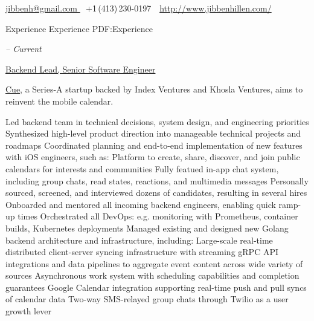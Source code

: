 \documentclass[letterpaper,nonstopmode]{simpleresumecv}
\newcommand{\CVAuthor}{Jibben Hillen}
\newcommand{\CVWebpage}{http://www.jibbenhillen.com/}
\begin{document}

\Title{\CVAuthor}

\begin{SubTitle}
\href{mailto:jibbenh@gmail.com}
{jibbenh@gmail.com }
\,\SubBulletSymbol\,
+1\,(413)\,230-0197
\,\SubBulletSymbol\,
\href{\CVWebpage}
{\url{\CVWebpage}}
\end{SubTitle}

\begin{Body}
\thispagestyle{empty}


\Section
{Experience}
{Experience}
{PDF:Experience}

\Entry
{}
\hfill \textit{ -- Current}
\SmallGap
\begin{Position}\underline{Backend Lead, Senior Software Engineer}\end{Position}
\Gap
\begin{Detail} \href{https://www.cue.app}{Cue}, a Series-A startup backed by Index Ventures and Khosla Ventures, aims to reinvent the mobile calendar.
\end{Detail}
\SmallGap
\BulletItem Led backend team in technical decisions, system design, and engineering priorities
\BulletItem Synthesized high-level product direction into manageable technical projects and roadmaps
\BulletItem Coordinated planning and end-to-end implementation of new features with iOS engineers, such as:
\SubBulletItem Platform to create, share, discover, and join public calendars for interests and communities
\SubBulletItem Fully featued in-app chat system, including group chats, read states, reactions, and multimedia messages
\BulletItem Personally sourced, screened, and interviewed dozens of candidates, resulting in several hires
\BulletItem Onboarded and mentored all incoming backend engineers, enabling quick ramp-up times
\BulletItem Orchestrated all DevOps: e.g. monitoring with Prometheus, container builds, Kubernetes deployments
\BulletItem Managed existing and designed new Golang backend architecture and infrastructure, including:
\SubBulletItem Large-scale real-time distributed client-server syncing infrastructure with streaming gRPC
\SubBulletItem API integrations and data pipelines to aggregate event content across wide variety of sources
\SubBulletItem Asynchronous work system with scheduling capabilities and completion guarantees
\SubBulletItem Google Calendar integration supporting real-time push and pull syncs of calendar data
\SubBulletItem Two-way SMS-relayed group chats through Twilio as a user growth lever
\BigGap


\end{Body}
\end{document}
